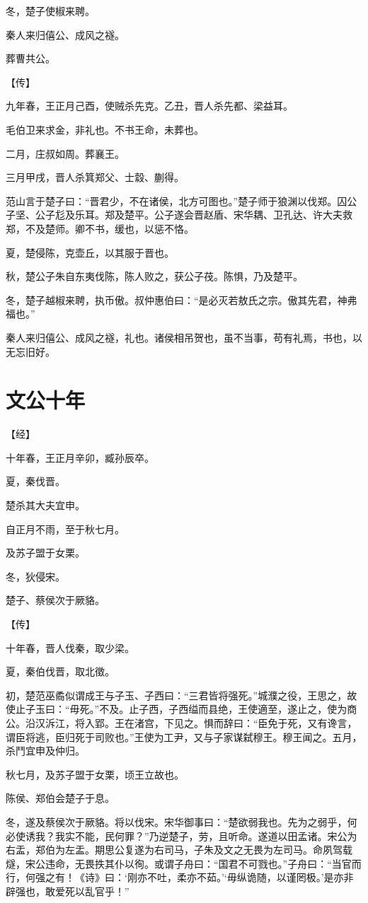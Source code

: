 \documentclass[a4paper,12pt,UTF8,twoside]{ctexbook}
\begin{document}
冬，楚子使椒来聘。

秦人来归僖公、成风之襚。

葬曹共公。

【传】

九年春，王正月己酉，使贼杀先克。乙丑，晋人杀先都、梁益耳。

毛伯卫来求金，非礼也。不书王命，未葬也。

二月，庄叔如周。葬襄王。

三月甲戌，晋人杀箕郑父、士縠、蒯得。

范山言于楚子曰：“晋君少，不在诸侯，北方可图也。”楚子师于狼渊以伐郑。囚公子坚、公子尨及乐耳。郑及楚平。公子遂会晋赵盾、宋华耦、卫孔达、许大夫救郑，不及楚师。卿不书，缓也，以惩不恪。

夏，楚侵陈，克壶丘，以其服于晋也。

秋，楚公子朱自东夷伐陈，陈人败之，获公子茷。陈惧，乃及楚平。

冬，楚子越椒来聘，执币傲。叔仲惠伯曰：“是必灭若敖氏之宗。傲其先君，神弗福也。”

秦人来归僖公、成风之襚，礼也。诸侯相吊贺也，虽不当事，苟有礼焉，书也，以无忘旧好。

\chapter{文公十年}



【经】

十年春，王正月辛卯，臧孙辰卒。

夏，秦伐晋。

楚杀其大夫宜申。

自正月不雨，至于秋七月。

及苏子盟于女栗。

冬，狄侵宋。

楚子、蔡侯次于厥貉。

【传】

十年春，晋人伐秦，取少梁。

夏，秦伯伐晋，取北徵。

初，楚范巫矞似谓成王与子玉、子西曰：“三君皆将强死。”城濮之役，王思之，故使止子玉曰：“毋死。”不及。止子西，子西缢而县绝，王使適至，遂止之，使为商公。沿汉泝江，将入郢。王在渚宫，下见之。惧而辞曰：“臣免于死，又有谗言，谓臣将逃，臣归死于司败也。”王使为工尹，又与子家谋弑穆王。穆王闻之。五月，杀鬥宜申及仲归。

秋七月，及苏子盟于女栗，顷王立故也。

陈侯、郑伯会楚子于息。

冬，遂及蔡侯次于厥貉。将以伐宋。宋华御事曰：“楚欲弱我也。先为之弱乎，何必使诱我？我实不能，民何罪？”乃逆楚子，劳，且听命。遂道以田孟诸。宋公为右盂，郑伯为左盂。期思公复遂为右司马，子朱及文之无畏为左司马。命夙驾载燧，宋公违命，无畏抶其仆以徇。或谓子舟曰：“国君不可戮也。”子舟曰：“当官而行，何强之有！《诗》曰：‘刚亦不吐，柔亦不茹。’‘毋纵诡随，以谨罔极。’是亦非辟强也，敢爱死以乱官乎！”
\end{document}
